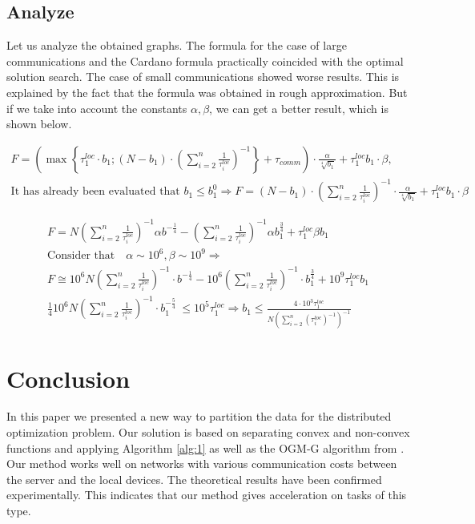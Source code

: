 \documentclass{article}
\begin{document}
\subsection{Analyze}
Let us analyze the obtained graphs. The formula for the case of large communications and the Cardano formula practically coincided with the optimal solution search. The case of small communications showed worse results. This is explained by the fact that the formula was obtained in rough approximation. But if we take into account the constants $\alpha, \beta$, we can get a better result, which is shown below.



\begin{gather*}
    F=\left(\max \left\{\tau_1^{loc} \cdot b_1 ;\left(N-b_1\right) \cdot\left(\sum_{i=2}^n \frac{1}{\tau_i^{loc}}\right)^{-1}\right\}+\tau_{comm}\right) \cdot \frac{\alpha}{\sqrt[4]{b_1}}+\tau_1^{loc} b_1 \cdot \beta, \\
    \text {It has already been evaluated that } b_1 \leq b_1^0 \Rightarrow F=\left(N-b_1\right)\cdot \left(\sum_{i=2}^n \frac{1}{\tau_i^{loc}}\right)^{-1} \cdot \frac{\alpha}{\sqrt[4]{b_1}}+\tau_1^{loc} b_1 \cdot \beta
\end{gather*}


\begin{gather*}
    F=N\left(\sum_{i=2}^n \frac{1}{\tau_i^{loc}}\right)^{-1} \alpha b^{-\frac{1}{4}}-\left(\sum_{i=2}^n \frac{1}{\tau_i^{loc}}\right)^{-1} \alpha b_1^{\frac{3}{4}}+\tau_1^{l o c} \beta b_1 \\
    \text {Consider that} \quad \alpha \sim 10^6, \beta \sim 10^9 \Rightarrow \\ 
    F \cong 10^6 N \left(\sum_{i=2}^n \frac{1}{\tau_i^{loc}}\right)^{-1} \cdot b^{-\frac{1}{4}}-10^6 \left(\sum_{i=2}^n \frac{1}{\tau_i^{loc}}\right)^{-1} \cdot b_1^{\frac{3}{4}}+10^9 \tau_1^{loc} b_1 \\
    \frac{1}{4} 10^6 N \left(\sum_{i=2}^n \frac{1}{\tau_i^{loc}}\right)^{-1} \cdot b_1^{-\frac{5}{4}} \ \leq 10^5 \tau_1^{loc} \Rightarrow b_1 \leq \frac{4 \cdot 10^3 \tau_1^{loc}}{N\left(\sum_{i=2}^n\left(\tau_i^{loc}\right)^{-1}\right)^{-1}}
\end{gather*}

\section{Conclusion}

In this paper we presented a new way to partition the data for the distributed optimization problem. Our solution is based on separating convex and non-convex functions and applying Algorithm \ref{alg:1} as well as the OGM-G algorithm from \citep{kim2021optimizing}. Our method works well on networks with various communication costs between the server and the local devices. The theoretical results have been confirmed experimentally. This indicates that our method gives acceleration on tasks of this type.


  
\end{document}
